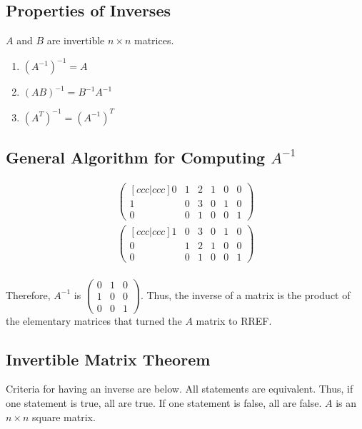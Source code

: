 \subsection{Properties of Inverses}
\(A\) and \(B\) are invertible \(n\times n\) matrices.
\begin{enumerate}
    \item \((A^{-1})^{-1}=A\)
    \item \((AB)^{-1}=B^{-1}A^{-1}\)
    \item \((A^T)^{-1} = (A^{-1})^T\)
\end{enumerate}

\subsection{General Algorithm for Computing \(A^{-1}\)}
\begin{align}
    \begin{pmatrix}[ccc|ccc]
        0 & 1 & 2 & 1 & 0 & 0 \\
        1 & 0 & 3 & 0 & 1 & 0 \\
        0 & 0 & 1 & 0 & 0 & 1
    \end{pmatrix} \\
    \begin{pmatrix}[ccc|ccc]
        1 & 0 & 3 & 0 & 1 & 0 \\
        0 & 1 & 2 & 1 & 0 & 0 \\
        0 & 0 & 1 & 0 & 0 & 1
    \end{pmatrix} \\
\end{align}

\noindent
\newline
Therefore, \(A^{-1}\) is \(\begin{pmatrix}
    0 & 1 & 0 \\
    1 & 0 & 0 \\
    0 & 0 & 1
\end{pmatrix}\). Thus, the inverse of a matrix is the product of the elementary matrices that turned the \(A\) matrix to RREF.

\subsection{Invertible Matrix Theorem}
Criteria for having an inverse are below. All statements are equivalent. Thus, if one statement is true, all are true. If one statement is false, all are false. \(A\) is an \(n \times n\) square matrix.

